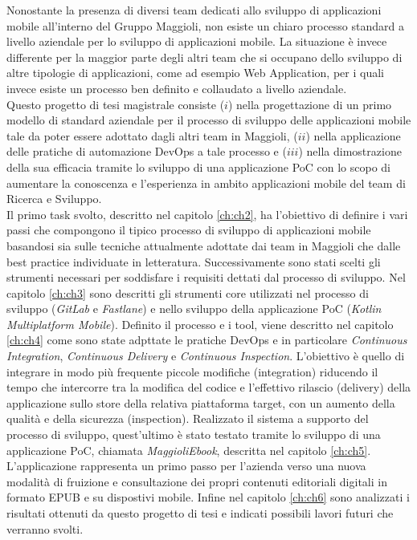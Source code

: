 
\parindent=0pt
Nonostante la presenza di diversi team dedicati allo sviluppo di applicazioni mobile all'interno del Gruppo Maggioli, non esiste un chiaro processo standard a livello aziendale per lo sviluppo di applicazioni mobile. La situazione è invece differente per la maggior parte degli altri team che si occupano dello sviluppo di altre tipologie di applicazioni, come ad esempio Web Application, per i quali invece esiste un processo ben definito e collaudato a livello aziendale.\\
Questo progetto di tesi magistrale consiste ($i$) nella progettazione di un primo modello di standard aziendale per il processo di sviluppo delle applicazioni mobile tale da poter essere adottato dagli altri team in Maggioli, ($ii$) nella applicazione delle pratiche di automazione DevOps a tale processo e ($iii$) nella dimostrazione della sua efficacia tramite lo sviluppo di una applicazione PoC con lo scopo di aumentare la conoscenza e l'esperienza in ambito applicazioni mobile del team di Ricerca e Sviluppo.\\
Il primo task svolto, descritto nel capitolo \ref{ch:ch2}, ha l'obiettivo di definire i vari passi che compongono il tipico processo di sviluppo di applicazioni mobile basandosi sia sulle tecniche attualmente adottate dai team in Maggioli che dalle best practice individuate in letteratura. Successivamente sono stati scelti gli strumenti necessari per soddisfare i requisiti dettati dal processo di sviluppo. Nel capitolo \ref{ch:ch3} sono descritti gli strumenti core utilizzati nel processo di sviluppo (\textit{GitLab} e \textit{Fastlane}) e nello sviluppo della applicazione PoC (\textit{Kotlin Multiplatform Mobile}). Definito il processo e i tool, viene descritto nel capitolo \ref{ch:ch4} come sono state adpttate le pratiche DevOps e in particolare \textit{Continuous Integration}, \textit{Continuous Delivery} e \textit{Continuous Inspection}. L'obiettivo è quello di integrare in modo più frequente piccole modifiche (integration) riducendo il tempo che intercorre tra la modifica del codice e l'effettivo rilascio (delivery) della applicazione sullo store della relativa piattaforma target, con un aumento della qualità e della sicurezza (inspection). Realizzato il sistema a supporto del processo di sviluppo, quest'ultimo è stato testato tramite lo sviluppo di una applicazione PoC, chiamata \textit{MaggioliEbook}, descritta nel capitolo \ref{ch:ch5}. L'applicazione rappresenta un primo passo per l'azienda verso una nuova modalità di fruizione e consultazione dei propri contenuti editoriali digitali in formato EPUB e su dispostivi mobile. Infine nel capitolo \ref{ch:ch6} sono analizzati i risultati ottenuti da questo progetto di tesi e indicati possibili lavori futuri che verranno svolti.
